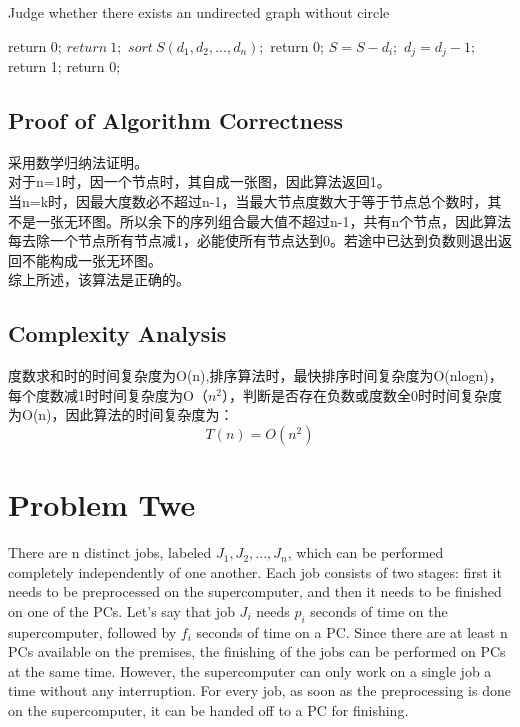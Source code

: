 \documentclass{article}
\begin{document}
\begin{algorithm}[htbp]  
  \caption{Judge whether there exists an undirected graph without circle}  
  \begin{algorithmic}[1] 
	\State return 0;
	\EndIf
	\State $return\ 1;$ 
	\EndIf
	\State $sort\ S(d_1,d_2,...,d_n);$
	\State return 0;
	\EndIf
	\State $S = S - d_i;$
	\State $d_j = d_j -1;$
	\EndFor
	\State return 1;
	\EndIf
	\State return 0;
	\EndIf
	\EndFor
    \EndFunction 
  \end{algorithmic}  
\end{algorithm} 

\subsection{Proof of Algorithm Correctness}
采用数学归纳法证明。\\

对于n=1时，因一个节点时，其自成一张图，因此算法返回1。\\

当n=k时，因最大度数必不超过n-1，当最大节点度数大于等于节点总个数时，其不是一张无环图。所以余下的序列组合最大值不超过n-1，共有n个节点，因此算法每去除一个节点所有节点减1，必能使所有节点达到0。若途中已达到负数则退出返回不能构成一张无环图。\\

综上所述，该算法是正确的。

\subsection{Complexity Analysis}
度数求和时的时间复杂度为O(n),排序算法时，最快排序时间复杂度为O(nlogn)，每个度数减1时时间复杂度为O（$n^2$），判断是否存在负数或度数全0时时间复杂度为O(n)，因此算法的时间复杂度为：
\begin{equation}
T(n) = O(n^2)
\end{equation}

\newpage
\section{Problem Twe}

There are n distinct jobs, labeled $J_1, J_2,..., J_n$, which can be performed completely independently of one another. Each job consists of two stages: first it needs to be preprocessed on the supercomputer, and then it needs to be finished on one of the PCs. Let's say that job $J_i$ needs $p_i$ seconds of time on the supercomputer, followed by $f_i$ seconds of time on a PC. Since there are at least n PCs available on the premises, the finishing of the jobs can be performed on PCs at the same time. However, the supercomputer can only work on a single job a time without any interruption. For every job, as soon as the preprocessing is done on the supercomputer, it can be handed off to a PC for finishing.
\end{document}
